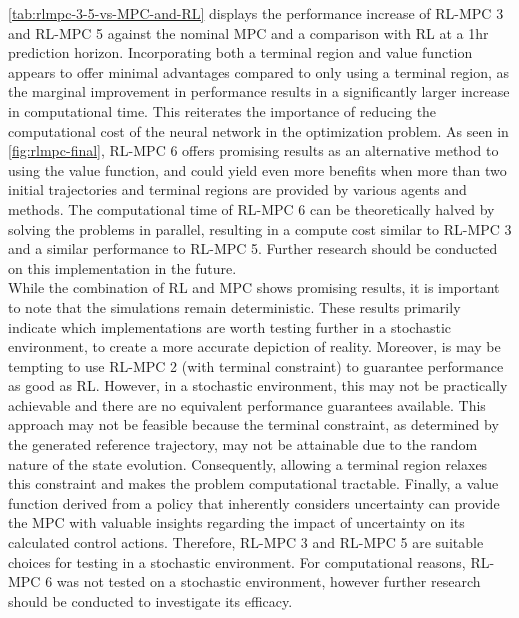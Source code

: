 \autoref{tab:rlmpc-3-5-vs-MPC-and-RL} displays the performance increase of RL-MPC 3 and RL-MPC 5 against the nominal MPC and a comparison with RL at a 1hr prediction horizon. Incorporating both a terminal region and value function  appears to offer minimal advantages compared to only using a terminal region, as the marginal improvement in performance results in a significantly larger increase in computational time. This reiterates the importance of reducing the computational cost of the neural network in the optimization problem. As seen in \autoref{fig:rlmpc-final}, RL-MPC 6 offers promising results as an alternative method to using the value function, and could yield even more benefits when more than two initial trajectories and terminal regions are provided by various agents and methods. The computational time of RL-MPC 6 can be theoretically halved by solving the problems in parallel, resulting in a compute cost similar to RL-MPC 3 and a similar performance to RL-MPC 5. Further research should be conducted on this implementation in the future.\\
While the combination of RL and MPC shows promising results, it is important to note that the simulations remain deterministic. These results primarily indicate which implementations are worth testing further in a stochastic environment, to create a more accurate depiction of reality. Moreover, is may be tempting to use RL-MPC 2 (with terminal constraint) to guarantee performance as good as RL. However, in a stochastic environment, this may not be practically achievable and there are no equivalent performance guarantees available. This approach may not be feasible because the terminal constraint, as determined by the generated reference trajectory, may not be attainable due to the random nature of the state evolution. Consequently, allowing a terminal region relaxes this constraint and makes the problem computational tractable. Finally, a value function derived from a policy that inherently considers uncertainty can provide the MPC with valuable insights regarding the impact of uncertainty on its calculated control actions. Therefore, RL-MPC 3 and RL-MPC 5 are suitable choices for testing in a stochastic environment. For computational reasons, RL-MPC 6 was not tested on a stochastic environment, however further research should be conducted to investigate its efficacy. 



